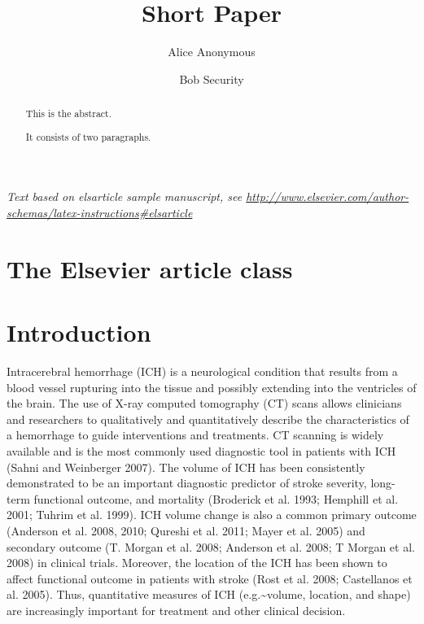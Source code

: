 \documentclass[]{elsarticle} %
\begin{document}
\begin{frontmatter}

  \title{Short Paper}
    \author[Some Institute of Technology]{Alice Anonymous}
    \author[Another University]{Bob Security}
  
      \address[Some Institute of Technology]{Department, Street, City, State, Zip}
    \address[Another University]{Department, Street, City, State, Zip}
  
  \begin{abstract}
  This is the abstract.
  
  It consists of two paragraphs.
  \end{abstract}
  
 \end{frontmatter}

\emph{Text based on elsarticle sample manuscript, see
\url{http://www.elsevier.com/author-schemas/latex-instructions\#elsarticle}}

\hypertarget{the-elsevier-article-class}{%
\section{The Elsevier article class}\label{the-elsevier-article-class}}

\hypertarget{introduction}{%
\section{Introduction}\label{introduction}}

Intracerebral hemorrhage (ICH) is a neurological condition that results
from a blood vessel rupturing into the tissue and possibly extending
into the ventricles of the brain. The use of X-ray computed tomography
(CT) scans allows clinicians and researchers to qualitatively and
quantitatively describe the characteristics of a hemorrhage to guide
interventions and treatments. CT scanning is widely available and is the
most commonly used diagnostic tool in patients with ICH (Sahni and
Weinberger 2007). The volume of ICH has been consistently demonstrated
to be an important diagnostic predictor of stroke severity, long-term
functional outcome, and mortality (Broderick et al. 1993; Hemphill et
al. 2001; Tuhrim et al. 1999). ICH volume change is also a common
primary outcome (Anderson et al. 2008, 2010; Qureshi et al. 2011; Mayer
et al. 2005) and secondary outcome (T. Morgan et al. 2008; Anderson et
al. 2008; T Morgan et al. 2008) in clinical trials. Moreover, the
location of the ICH has been shown to affect functional outcome in
patients with stroke (Rost et al. 2008; Castellanos et al. 2005). Thus,
quantitative measures of ICH (e.g.\textasciitilde{}volume, location, and
shape) are increasingly important for treatment and other clinical
decision.
\end{document}
